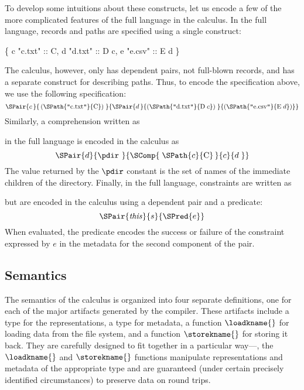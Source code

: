 To develop some intuitions about these constructs, let us encode a few
of the more complicated features of the full \forest{} language in the
calculus. In the full language, records and paths are specified using
a single construct:
%
\begin{centercode}
  \{ c  "c.txt" :: C, 
    d  "d.txt" :: D c, 
    e  "e.csv" :: E d \}
\end{centercode}
%
The calculus, however, only has dependent pairs, not full-blown
records, and has a separate construct for describing paths. Thus, to
encode the specification above, we use the following specification:
%
\[
\SPair{c\,}{\,(\SPath{\texttt{"}\mathrm{c.txt}\texttt{"}}{\mathrm{C}})\;}
           {\SPair{d\,}{(\SPath{\texttt{"}\mathrm{d.txt}\texttt{"}}{\mathrm{D}\; c})\;}
                       {(\SPath{\texttt{"}\mathrm{e.csv}\texttt{"}}{\mathrm{E}\; d})}} 
\]
%
Similarly, a comprehension written as
%
\begin{center}
\cd{[c :: C | c <- \kw{matches} <| GL "*" |> ]} 
\end{center}
%
in the full language is encoded in the calculus as
%
\[
\SPair{d}{\pdir~}{\SComp{\;\SPath{c}{\mathrm{C}}\,}{c}{d\;}}
\]
%
The value returned by the $\pdir$ constant is the set of names of the
immediate children of the directory. Finally, in the full language,
constraints are written as
%
\begin{center}
\end{center}
%
but are encoded in the calculus using a dependent pair and a
predicate:
%
\[
\SPair{\mathit{this}}{s}{\SPred{e}}
\]
%
When evaluated, the predicate encodes the success or failure of the
constraint expressed by $e$ in the metadata for the second component
of the pair.

\subsection{Semantics}
%
The semantics of the \forest{} calculus is organized into four
separate definitions, one for each of the major artifacts generated by
the compiler. These artifacts include a type for the representations,
a type for metadata, a function $\loadkname{}$ for loading data from
the file system, and a function $\storekname{}$ for storing it
back. They are carefully designed to fit together in a particular
way---\eg, the $\loadkname{}$ and $\storekname{}$ functions manipulate
representations and metadata of the appropriate type and are
guaranteed (under certain precisely identified circumstances) to
preserve data on round trips.

